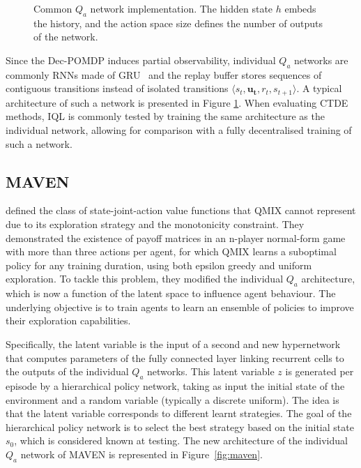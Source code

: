 \begin{figure}
    \centering

\caption{Common $Q_a$ network implementation. The hidden state $h$ embeds the history, and the action space size defines the number of outputs of the network.}
\label{fig:ch3_indivQ}
\end{figure}

Since the Dec-POMDP induces partial observability, individual $Q_a$ networks are commonly RNNs made of GRU~\citep{Chung2014EmpiricalModeling} and the replay buffer stores sequences of contiguous transitions instead of isolated transitions $\langle s_{t},\mathbf{u_{t}},r_{t},s_{t+1}\rangle$.
A typical architecture of such a network is presented in Figure \ref{fig:ch3_indivQ}.
When evaluating CTDE methods, IQL is commonly tested by training the same architecture as the individual network, allowing for comparison with a fully decentralised training of such a network.

\subsection{MAVEN}
\citet{Mahajan2019MAVEN:Exploration} defined the class of state-joint-action value functions that QMIX cannot represent due to its exploration strategy and the monotonicity constraint.
They demonstrated the existence of payoff matrices in an n-player normal-form game with more than three actions per agent, for which QMIX learns a suboptimal policy for any training duration, using both epsilon greedy and uniform exploration.
To tackle this problem, they modified the individual $Q_a$ architecture, which is now a function of the latent space to influence agent behaviour.
The underlying objective is to train agents to learn an ensemble of policies to improve their exploration capabilities.

Specifically, the latent variable is the input of a second and new hypernetwork that computes parameters of the fully connected layer linking recurrent cells to the outputs of the individual $Q_a$ networks.
This latent variable $z$ is generated per episode by a hierarchical policy network, taking as input the initial state of the environment and a random variable (typically a discrete uniform).
The idea is that the latent variable corresponds to different learnt strategies.
The goal of the hierarchical policy network is to select the best strategy based on the initial state $s_0$, which is considered known at testing.
The new architecture of the individual $Q_a$ network of MAVEN is represented in Figure~\ref{fig:maven}.

